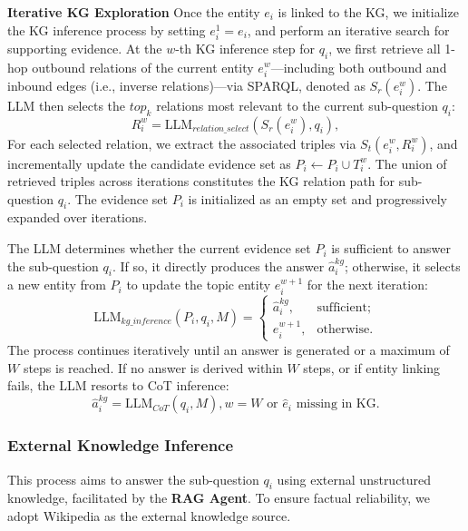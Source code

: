 \textbf{Iterative KG Exploration} Once the entity $e_i$ is linked to the KG, we initialize the KG inference process by setting $e_i^1 = e_i$, and perform an iterative search for supporting evidence. At the $w$-th KG inference step for $q_i$, we first retrieve all 1-hop outbound relations of the current entity $e_i^w$—including both outbound and inbound edges (i.e., inverse relations)—via SPARQL, denoted as $S_r(e_i^w)$. The LLM then selects the $top_k$ relations most relevant to the current sub-question $q_i$:
\begin{equation}
R_i^{w} = \text{LLM}_{relation\_select}(S_r(e_i^{w}), q_i),
\end{equation}
For each selected relation, we extract the associated triples via $S_t(e_i^w, R_i^w)$, and incrementally update the candidate evidence set as $P_i \leftarrow P_i \cup T_i^w$. The union of retrieved triples across iterations constitutes the KG relation path for sub-question $q_i$. The evidence set $P_i$ is initialized as an empty set and progressively expanded over iterations.

The LLM determines whether the current evidence set $P_i$ is sufficient to answer the sub-question $q_i$. If so, it directly produces the answer $\hat{a}_i^{kg}$; otherwise, it selects a new entity from $P_i$ to update the topic entity $e_i^{w+1}$ for the next iteration:
\begin{equation}
\text{LLM}_{kg\_inference}(P_i, q_i, M) =
\begin{cases}
\hat{a}_i^{kg}, & \text{sufficient;} \\
e_i^{w+1}, & \text{otherwise.}
\end{cases}
\end{equation}
The process continues iteratively until an answer is generated or a maximum of $W$ steps is reached. If no answer is derived within $W$ steps, or if entity linking fails, the LLM resorts to CoT inference:
\begin{equation}
\hat{a}_i^{kg}=\text{LLM}_{CoT}(q_i, M), w=W \text{ or } \hat{e}_i \text{ missing in KG}.
\label{eq:kg_cot_reasoning}
\end{equation}
\subsubsection{External Knowledge Inference}
This process aims to answer the sub-question $q_i$ using external unstructured knowledge, facilitated by the \textbf{RAG Agent}. To ensure factual reliability, we adopt Wikipedia as the external knowledge source.

